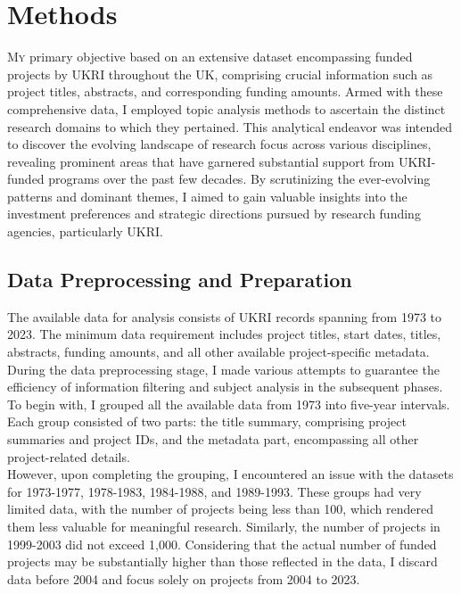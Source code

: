\chapter{Methods}
\lettrine[lines=1]{M}{y}
primary objective based on an extensive dataset encompassing funded projects by UKRI throughout the UK, comprising crucial information such as project titles, abstracts, and corresponding funding amounts. Armed with these comprehensive data, I employed topic analysis methods to ascertain the distinct research domains to which they pertained. This analytical endeavor was intended to discover the evolving landscape of research focus across various disciplines, revealing prominent areas that have garnered substantial support from UKRI-funded programs over the past few decades. By scrutinizing the ever-evolving patterns and dominant themes, I aimed to gain valuable insights into the investment preferences and strategic directions pursued by research funding agencies, particularly UKRI. \\

\section*{Data Preprocessing and Preparation}
The available data for analysis consists of UKRI records spanning from 1973 to 2023. The minimum data requirement includes project titles, start dates, titles, abstracts, funding amounts, and all other available project-specific metadata. \\

During the data preprocessing stage, I made various attempts to guarantee the efficiency of information filtering and subject analysis in the subsequent phases. To begin with, I grouped all the available data from 1973 into five-year intervals. Each group consisted of two parts: the title summary, comprising project summaries and project IDs, and the metadata part, encompassing all other project-related details.\\

However, upon completing the grouping, I encountered an issue with the datasets for 1973-1977, 1978-1983, 1984-1988, and 1989-1993. These groups had very limited data, with the number of projects being less than 100, which rendered them less valuable for meaningful research. Similarly, the number of projects in 1999-2003 did not exceed 1,000. Considering that the actual number of funded projects may be substantially higher than those reflected in the data, I discard data before 2004 and focus solely on projects from 2004 to 2023.\\

